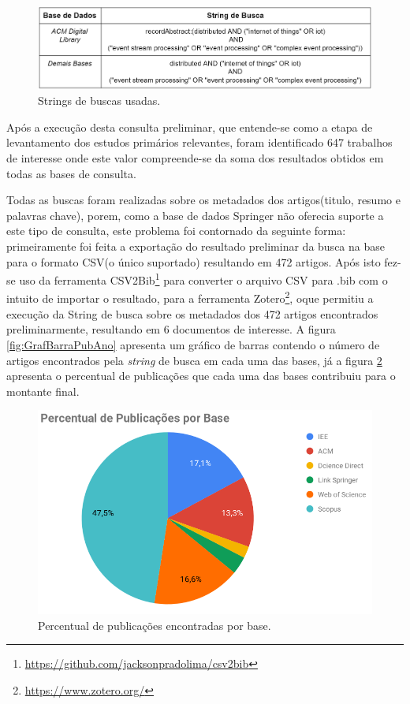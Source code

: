 \documentclass[tid,table]{texufpel} %
\begin{document}
\begin{figure}[ht]
	\centering
	\includegraphics[width=1\textwidth]{imagens/tabela_string_busca.png}
	\caption{Strings de buscas usadas.}
	\label{tab:stringBusca}
\end{figure}

Após a execução desta consulta preliminar, que entende-se como a etapa de levantamento dos estudos primários relevantes, foram identificado 647 trabalhos de interesse onde este valor  compreende-se da soma dos resultados obtidos em todas as bases de consulta.

Todas as buscas foram realizadas sobre os metadados dos artigos(titulo, resumo e palavras chave), porem, como a base de dados Springer não oferecia suporte a este tipo de consulta, este problema foi contornado da seguinte forma: primeiramente foi feita a exportação do resultado preliminar da busca na base para o formato CSV(o único suportado) resultando em 472 artigos. Após isto fez-se uso da ferramenta CSV2Bib\footnote{\url{https://github.com/jacksonpradolima/csv2bib}} para converter o arquivo CSV para .bib com o intuito de importar o resultado, para a ferramenta Zotero\footnote{\url{https://www.zotero.org/}}, oque permitiu a execução da String de busca sobre os metadados dos 472 artigos encontrados preliminarmente, resultando em 6 documentos de interesse. A figura  \ref{fig:GrafBarraPubAno} apresenta um gráfico de barras contendo o número de artigos encontrados pela \textit{string} de busca em cada uma das bases, já a figura \ref{fig:GrafPizPubAno} apresenta o percentual de publicações que cada uma das bases contribuiu para o montante final.

\begin{figure}[ht]
	\centering
	\includegraphics[width=.9\textwidth]{imagens/GrafPizPubAno.png}
	\caption{Percentual de publicações encontradas por base.}
	\label{fig:GrafPizPubAno}
\end{figure}
\end{document}
